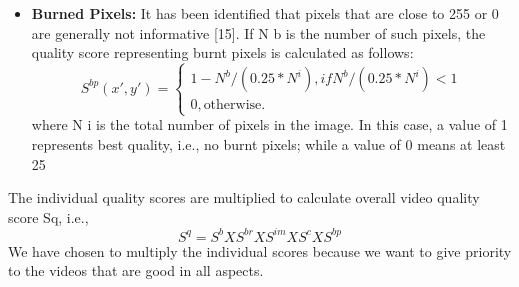 \documentclass{sig-alternate}
\begin{document}
\begin{itemize}
\item \textbf{Burned Pixels:} It has been identified that pixels that are
close to 255 or 0 are generally not informative [15]. If N b
is the number of such pixels, the quality score representing
burnt pixels is calculated as follows:
\begin{equation}
S^{bp}(x',y')=
\begin{cases}
1 - N^b/(0.25*N^i),if N^b/(0.25*N^i) < 1 \\
0, \text{otherwise}. 
\end{cases}
\end{equation}
where N i is the total number of pixels in the image. In this
case, a value of 1 represents best quality, i.e., no burnt pixels;
while a value of 0 means at least 25%
\end{itemize} 
The individual quality scores are multiplied to calculate overall video quality score Sq, i.e.,
\begin{equation}
S^q = S^b X S^{br} X S^{im} X S^c X S^{bp} 
\end{equation}
We have chosen to multiply the individual scores because we want to give priority to the videos that are good in all aspects. 
\end{document}

